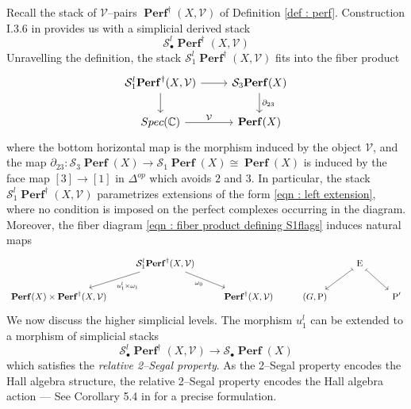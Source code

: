 \documentclass[11pt]{article}
\newcommand{\BC}{\mathbb{C}}
\newcommand{\segal}{\mathcal{S}}
\newcommand{\perfstack}{\boldsymbol{\operatorname{Perf}}(X)}
\newcommand{\framing}{\mathcal{V}}
\newcommand{\flags}{\boldsymbol{\operatorname{Perf}}^{\dagger}(X,\mathcal{V})}
\newcommand{\waldhausen}{\mathcal{S}_{\bullet}}
\begin{document}
   Recall the stack of $\framing$--pairs $\flags$ of Definition \ref{def : perf}. Construction I.3.6 in \cite{dps} provides us with a simplicial derived stack
\begin{equation}\label{eqn : flags relative}
    \waldhausen^l\flags 
\end{equation}
Unravelling the definition, the stack $\segal^l_1\flags$ fits into the fiber product
\begin{equation}\label{eqn : fiber product defining S1flags}
\begin{tikzcd}
	{\segal^l_1\flags} & {\segal_3\perfstack} \\
	{Spec(\BC)} & {\perfstack}
	\arrow[from=1-1, to=1-2]
	\arrow[from=1-1, to=2-1]
	\arrow["{\partial_{23}}", from=1-2, to=2-2]
	\arrow["\framing", from=2-1, to=2-2]
\end{tikzcd}
\end{equation}
where the bottom horizontal map is the morphism induced by the object $\framing$, and the map $\partial_{23} \colon \segal_3\perfstack \rightarrow \segal_1\perfstack\cong \perfstack$ is induced by the face map $[3] \rightarrow[1]$ in $\Delta^{op}$ which avoids $2$ and $3$. In particular, the stack $\segal^l_1\flags$ parametrizes extensions of the form \eqref{eqn : left extension}, where no condition is imposed on the perfect complexes occurring in the diagram. Moreover, the fiber diagram \eqref{eqn : fiber product defining S1flags} induces natural maps
\begin{equation}\label{eqn : convolution left}
\begin{tikzcd}
	& {\segal_1^l\flags} &&& {\operatorname{E}} \\
	{\perfstack \times \flags} && \flags & {(G,\operatorname{P})} && {\operatorname{P}'}
	\arrow["{u^l_1 \times \omega_1}", from=1-2, to=2-1]
	\arrow["{\omega_0}"', from=1-2, to=2-3]
	\arrow[maps to, from=1-5, to=2-4]
	\arrow[maps to, from=1-5, to=2-6]
\end{tikzcd}
\end{equation}
 We now discuss the higher simplicial levels. The morphism $u_1^l$ can be extended to a morphism of simplicial stacks
 \begin{equation}\label{eqn : relative simp flags}
     \waldhausen^l\flags \longrightarrow \waldhausen\perfstack
 \end{equation}
 which satisfies the \textit{relative 2--Segal property}. As the 2--Segal property encodes the Hall algebra structure, the relative 2--Segal property encodes the Hall algebra action --- See Corollary 5.4 in \cite{godicke2024infty} for a precise formulation. 
 \bigskip
\end{document}

